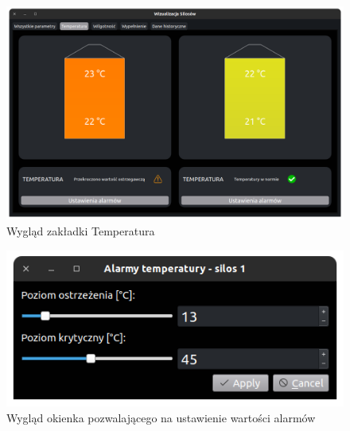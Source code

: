             \begin{figure}[H]
                \centering
                \includegraphics[width = \textwidth]{obrazy/temp_10_05.png}
                \caption{Wygląd zakładki Temperatura}
                \label{fig: temp 10 05}
            \end{figure}

            \begin{figure}[H]
                \centering
                \includegraphics[width = \textwidth]{obrazy/alarm_window_10_05.png}
                \caption{Wygląd okienka pozwalającego na ustawienie wartości alarmów}
                \label{fig: alarms window 10 05}
            \end{figure}